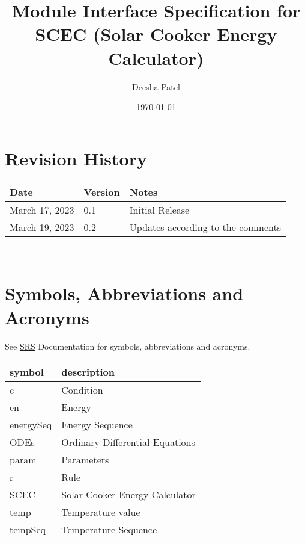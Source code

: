 \documentclass[12pt, titlepage]{article}
\begin{document}
\title{Module Interface Specification for SCEC (Solar Cooker Energy Calculator)}

\author{Deesha Patel}

\date{\today}

\maketitle


\section{Revision History}

\begin{tabularx}{\textwidth}{p{3cm}p{2cm}X}
\toprule {\bf Date} & {\bf Version} & {\bf Notes}\\
\midrule
March 17, 2023 & 0.1 & Initial Release\\
March 19, 2023 & 0.2 & Updates according to the comments \\ 
\bottomrule
\end{tabularx}

~\newpage

\section{Symbols, Abbreviations and Acronyms}

See \href{https://github.com/DeeshaPatel/CAS-741-Solar-Cooker/blob/c7cc1be3611cae9110b84940b64ef40c7d29aa02/docs/SRS/SRS.pdf}{SRS} Documentation for symbols, abbreviations and acronyms. \\ 

\renewcommand{\arraystretch}{1.2}
\begin{tabular}{l l} 
  \toprule		
  \textbf{symbol} & \textbf{description}\\
  \midrule 
  c & Condition\\
  en & Energy \\
  energySeq & Energy Sequence\\
  ODEs & Ordinary Differential Equations \\ 
  param & Parameters\\
  r & Rule  \\
  SCEC & Solar Cooker Energy Calculator \\
  temp & Temperature value \\
  tempSeq & Temperature Sequence \\
  \bottomrule
\end{tabular}\\
\end{document}
